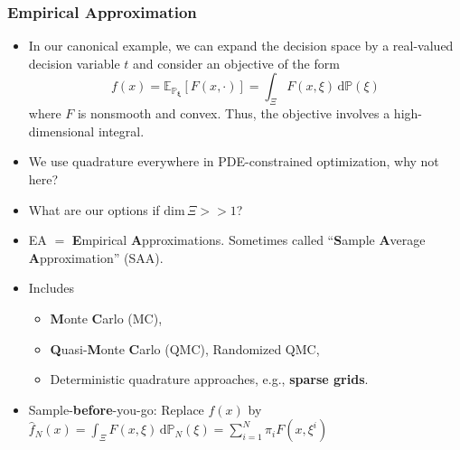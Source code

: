 \documentclass[aspectratio=169,xcolor=dvipsnames,10pt]{beamer}
\newcommand{\bbp}{\mathbb{P}}
\begin{document}
\begin{frame}\frametitle{Empirical Approximation}

\begin{block}{}
\begin{itemize}
\item
In our canonical example, we can expand the decision space by a real-valued decision variable $t$ and consider an objective of the form
\[
 f(x) = \mathbb E_{\mathbb P_{\bm \xi}}[F(x,\cdot)] = \int_{\Xi} F(x,\xi) \, \mathrm{d} \mathbb P(\xi)
 \]
 where $F$ is nonsmooth and convex. Thus, the objective involves a high-dimensional integral. 
 \item We use quadrature everywhere in PDE-constrained optimization, why not here? \item What are our options if $\mathrm{dim}\, \Xi >> 1$?
 \end{itemize}\pause
\end{block}

\begin{block}{}
\begin{itemize}
\item EA $=$ \textbf{E}mpirical \textbf{A}pproximations. Sometimes called ``\textbf{S}ample \textbf{A}verage \textbf{A}pproximation'' (SAA).
\item Includes
\begin{itemize}
\item \textbf{M}onte \textbf{C}arlo (MC), 
\item \textbf{Q}uasi-\textbf{M}onte \textbf{C}arlo (QMC), Randomized QMC,
\item Deterministic quadrature approaches, e.g., \textbf{sparse grids}.
\end{itemize}
\item Sample-\textbf{before}-you-go: Replace $f(x)$ by $\widehat{f}_{N}(x) = \int_{\Xi} F(x,\xi) \, \mathrm{d} \bbp_{N}(\xi) = \sum_{i=1}^{N} \pi_i F(x,\xi^i)$
\end{itemize}
\end{block}
\end{frame}
\end{document}
